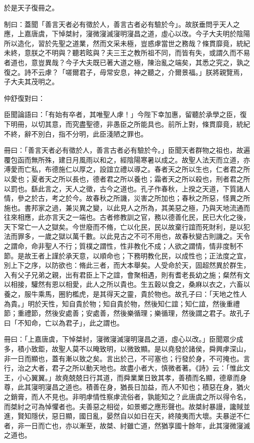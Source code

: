 \begin{pinyinscope}
於是天子復冊之。

制曰：蓋聞「善言天者必有徵於人，善言古者必有驗於今」。故朕垂問乎天人之應，上嘉唐虞，下悼桀紂，寖微寖滅寖明寖昌之道，虛心以改。今子大夫明於陰陽所以造化，習於先聖之道業，然而文采未極，豈惑虖當世之務哉？條貫靡竟，統紀未終，意朕之不明與？聽若眩與？夫三王之教所祖不同，而皆有失，或謂久而不易者道也，意豈異哉？今子大夫既已著大道之極，陳治亂之端矣，其悉之究之，孰之復之。詩不云虖？「嗟爾君子，毋常安息，神之聽之，介爾景福。」朕將親覽焉，子大夫其茂明之。

仲舒復對曰：

臣聞論語曰：「有始有卒者，其唯聖人虖！」今陛下幸加惠，留聽於承學之臣，復下明冊，以切其意，而究盡聖德，非愚臣之所能具也。前所上對，條貫靡竟，統紀不終，辭不別白，指不分明，此臣淺陋之罪也。

冊曰：「善言天者必有徵於人，善言古者必有驗於今。」臣聞天者群物之祖也，故遍覆包函而無所殊，建日月風雨以和之，經陰陽寒暑以成之。故聖人法天而立道，亦溥愛而亡私，布德施仁以厚之，設誼立禮以導之。春者天之所以生也，仁者君之所以愛也；夏者天之所以長也，德者君之所以養也；霜者天之所以殺也，刑者君之所以罰也。繇此言之，天人之徵，古今之道也。孔子作春秋，上揆之天道，下質諸人情，參之於古，考之於今。故春秋之所譏，災害之所加也；春秋之所惡，怪異之所施也。書邦家之過，兼災異之變，以此見人之所為，其美惡之極，乃與天地流通而往來相應，此亦言天之一端也。古者修教訓之官，務以德善化民，民已大化之後，天下常亡一人之獄矣。今世廢而不脩，亡以化民，民以故棄行誼而死財利，是以犯法而罪多，一歲之獄以萬千數。以此見古之不可不用也，故春秋變古則譏之。天令之謂命，命非聖人不行；質樸之謂性，性非教化不成；人欲之謂情，情非度制不節。是故王者上謹於承天意，以順命也；下務明教化民，以成性也；正法度之宜，別上下之序，以防欲也：脩此三者，而大本舉矣。人受命於天，固超然異於群生，入有父子兄弟之親，出有君臣上下之誼，會聚相遇，則有耆老長幼之施；粲然有文以相接，驩然有恩以相愛，此人之所以貴也。生五穀以食之，桑麻以衣之，六畜以養之，服牛乘馬，圈豹檻虎，是其得天之靈，貴於物也。故孔子曰：「天地之性人為貴。」明於天性，知自貴於物；知自貴於物，然後知仁誼；知仁誼，然後重禮節；重禮節，然後安處善；安處善，然後樂循理；樂循理，然後謂之君子。故孔子曰「不知命，亡以為君子」，此之謂也。

冊曰：「上嘉唐虞，下悼桀紂，寖微寖滅寖明寖昌之道，虛心以改。」臣聞眾少成多，積小致鉅，故聖人莫不以晻致明，以微致顯。是以堯發於諸侯，舜興虖深山，非一日而顯也，蓋有漸以致之矣。言出於己，不可塞也；行發於身，不可掩也。言行，治之大者，君子之所以動天地也。故盡小者大，慎微者著。《詩》云：「惟此文王，小心翼翼。」故堯兢兢日行其道，而舜業業日致其孝，善積而名顯，德章而身尊，此其寖明寖昌之道也。積善在身，猶長日加益，而人不知也；積惡在身，猶火之銷膏，而人不見也。非明虖情性察虖流俗者，孰能知之？此唐虞之所以得令名，而桀紂之可為悼懼者也。夫善惡之相從，如景鄉之應形聲也。故桀紂暴謾，讒賊並進，賢知隱伏，惡日顯，國日亂，晏然自以如日在天，終陵夷而大壞。夫暴逆不仁者，非一日而亡也，亦以漸至，故桀、紂雖亡道，然猶享國十餘年，此其寖微寖滅之道也。


\end{pinyinscope}
